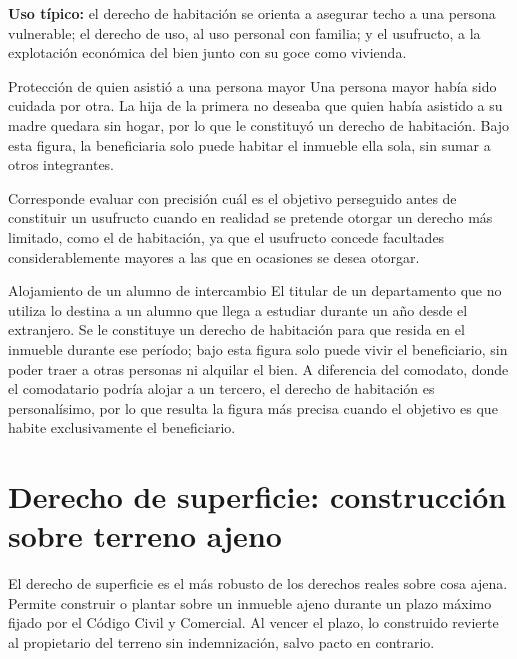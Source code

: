 \documentclass[12pt,oneside]{book}
\begin{document}
\textbf{Uso típico:} el derecho de habitación se orienta a asegurar techo a una persona vulnerable; el derecho de uso, al uso personal con familia; y el usufructo, a la explotación económica del bien junto con su goce como vivienda.

\begin{example}{Protección de quien asistió a una persona mayor}
Una persona mayor había sido cuidada por otra. La hija de la primera no deseaba que quien había asistido a su madre quedara sin hogar, por lo que le constituyó un derecho de habitación. Bajo esta figura, la beneficiaria solo puede habitar el inmueble ella sola, sin sumar a otros integrantes.
\end{example}

\begin{important}
Corresponde evaluar con precisión cuál es el objetivo perseguido antes de constituir un usufructo cuando en realidad se pretende otorgar un derecho más limitado, como el de habitación, ya que el usufructo concede facultades considerablemente mayores a las que en ocasiones se desea otorgar.
\end{important}

\begin{example}{Alojamiento de un alumno de intercambio}
El titular de un departamento que no utiliza lo destina a un alumno que llega a estudiar durante un año desde el extranjero. Se le constituye un derecho de habitación para que resida en el inmueble durante ese período; bajo esta figura solo puede vivir el beneficiario, sin poder traer a otras personas ni alquilar el bien. A diferencia del comodato, donde el comodatario podría alojar a un tercero, el derecho de habitación es personalísimo, por lo que resulta la figura más precisa cuando el objetivo es que habite exclusivamente el beneficiario.
\end{example}

\section{Derecho de superficie: construcción sobre terreno ajeno}

\begin{important}
El derecho de superficie es el más robusto de los derechos reales sobre cosa ajena. Permite construir o plantar sobre un inmueble ajeno durante un plazo máximo fijado por el Código Civil y Comercial. Al vencer el plazo, lo construido revierte al propietario del terreno sin indemnización, salvo pacto en contrario.
\end{important}
\end{document}
